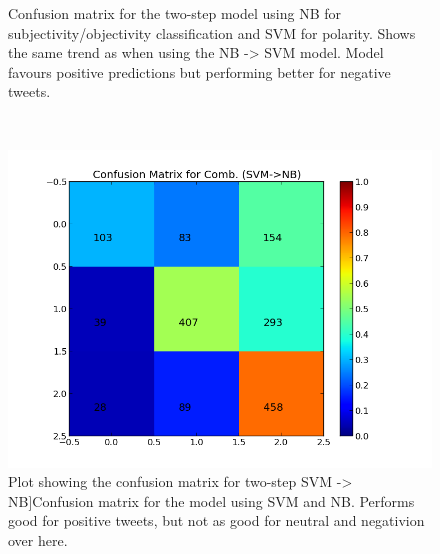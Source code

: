 \begin{minipage}[s]{\linewidth}
\begin{minipage}{0.45\linewidth}
\begin{figure}[H]
           \caption[Plot showing the confusion matrix for two-step NB -> MaxEnt]{Confusion matrix for the two-step model using NB for subjectivity/objectivity classification and SVM for polarity. Shows the same trend as when using the NB -> SVM model. Model favours positive predictions but performing better for negative tweets.}
           \label{fig:confmat_nb_maxent}
          \end{figure}
     \end{minipage} \\ 

     \begin{minipage}{0.45\linewidth}
           \begin{figure}[H]
                \includegraphics[width=\linewidth]{../img/plots/grid/confusion_matrix_Comb-SVM-NB.png}
         Plot showing the confusion matrix for two-step SVM -> NB]{Confusion matrix for the model using SVM and NB. Performs good for positive tweets, but not as good for neutral and negativion over here.}
            \label{fig:confmat_svm_nb}
           \end{figure}
      \end{minipage}
      \hspace{0.05\linewidth}
      \begin{minipage}{0.45\linewidth}
           \begin{figure}[H]

\end{figure}
\end{minipage}
\end{minipage}

